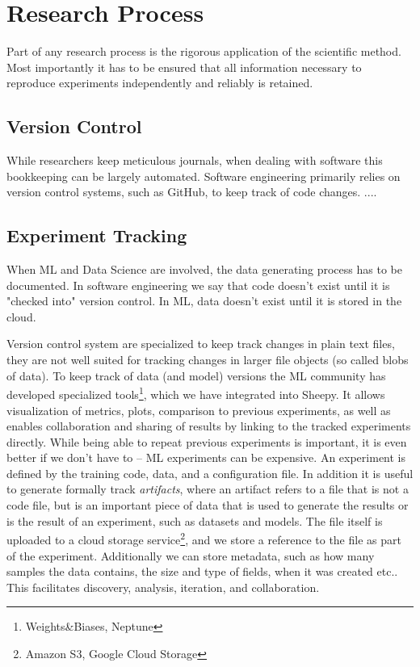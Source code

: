 
\section{Research Process}
Part of any research process is the rigorous application of the scientific method.
Most importantly it has to be ensured that all information necessary to reproduce experiments independently and reliably is retained.

\subsection{Version Control}
While researchers keep meticulous journals, when dealing with software this bookkeeping can be largely automated.
Software engineering primarily relies on version control systems, such as GitHub, to keep track of code changes.
....

\subsection{Experiment Tracking}
When ML and Data Science are involved, the data generating process has to be documented.
In software engineering we say that code doesn't exist until it is "checked into" version control.
In ML, data doesn't exist until it is stored in the cloud.

Version control system are specialized to keep track changes in plain text files, they are not well suited for tracking changes in larger file objects (so called blobs of data).
To keep track of data (and model) versions the ML community has developed specialized tools\footnote{Weights\&Biases, Neptune}, which we have integrated into Sheepy.
It allows visualization of metrics, plots, comparison to previous experiments, as well as enables collaboration and sharing of results by linking to the tracked experiments directly.
While being able to repeat previous experiments is important, it is even better if we don't have to -- ML experiments can be expensive.
An experiment is defined by the training code, data, and a configuration file.
In addition it is useful to generate formally track \textit{artifacts}, where an artifact refers to a file that is not a code file, but is an important piece of data that is used to generate the results or is the result of an experiment, such as datasets and models.
The file itself is uploaded to a cloud storage service\footnote{Amazon S3, Google Cloud Storage}, and we store a reference to the file as part of the experiment.
Additionally we can store metadata, such as how many samples the data contains, the size and type of fields, when it was created etc..
This facilitates discovery, analysis, iteration, and collaboration.


